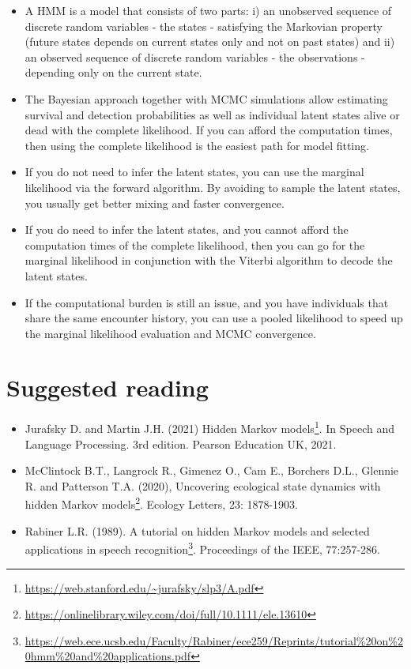 \documentclass[
  12pt,
]{krantz}
\renewcommand{\href}[2]{#2\footnote{\url{#1}}}
\begin{document}
\begin{itemize}
\item
  A HMM is a model that consists of two parts: i) an unobserved sequence of discrete random variables - the states - satisfying the Markovian property (future states depends on current states only and not on past states) and ii) an observed sequence of discrete random variables - the observations - depending only on the current state.
\item
  The Bayesian approach together with MCMC simulations allow estimating survival and detection probabilities as well as individual latent states alive or dead with the complete likelihood. If you can afford the computation times, then using the complete likelihood is the easiest path for model fitting.
\item
  If you do not need to infer the latent states, you can use the marginal likelihood via the forward algorithm. By avoiding to sample the latent states, you usually get better mixing and faster convergence.
\item
  If you do need to infer the latent states, and you cannot afford the computation times of the complete likelihood, then you can go for the marginal likelihood in conjunction with the Viterbi algorithm to decode the latent states.
\item
  If the computational burden is still an issue, and you have individuals that share the same encounter history, you can use a pooled likelihood to speed up the marginal likelihood evaluation and MCMC convergence.
\end{itemize}

\hypertarget{suggested-reading-2}{%
\section{Suggested reading}\label{suggested-reading-2}}

\begin{itemize}
\item
  Jurafsky D. and Martin J.H. (2021) \href{https://web.stanford.edu/~jurafsky/slp3/A.pdf}{Hidden Markov models}. In Speech and Language Processing. 3rd edition. Pearson Education UK, 2021.
\item
  McClintock B.T., Langrock R., Gimenez O., Cam E., Borchers D.L., Glennie R. and Patterson T.A. (2020), \href{https://onlinelibrary.wiley.com/doi/full/10.1111/ele.13610}{Uncovering ecological state dynamics with hidden Markov models}. Ecology Letters, 23: 1878-1903.
\item
  Rabiner L.R. (1989). \href{https://web.ece.ucsb.edu/Faculty/Rabiner/ece259/Reprints/tutorial\%20on\%20hmm\%20and\%20applications.pdf}{A tutorial on hidden Markov models and selected applications in speech recognition}. Proceedings of the IEEE, 77:257-286.
\end{itemize}
\end{document}

